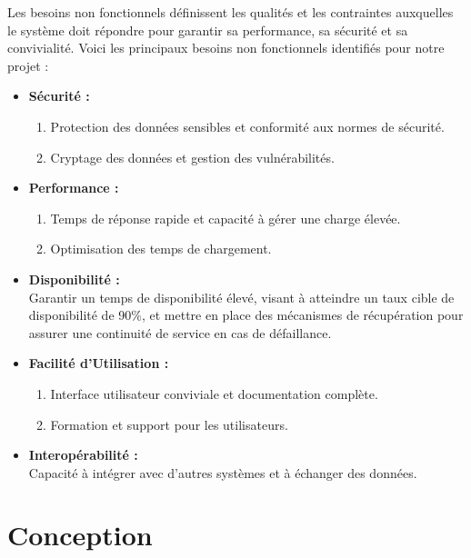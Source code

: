 \hspace{\parindent}Les besoins non fonctionnels définissent les qualités et les contraintes auxquelles le système doit répondre pour garantir sa performance, sa sécurité et sa convivialité. Voici les principaux besoins non fonctionnels identifiés pour notre projet :
\begin{itemize}
  \item \textbf{Sécurité :}
        \begin{enumerate}
          \item Protection des données sensibles et conformité aux normes de sécurité.
          \item Cryptage des données et gestion des vulnérabilités.
        \end{enumerate}

  \item \textbf{Performance :}
        \begin{enumerate}
          \item Temps de réponse rapide et capacité à gérer une charge élevée.
          \item Optimisation des temps de chargement.
        \end{enumerate}

  \item \textbf{Disponibilité :}\\
        Garantir un temps de disponibilité élevé, visant à atteindre un taux cible de disponibilité de 90\%, et mettre en place des mécanismes de récupération pour assurer une continuité de service en cas de défaillance.

  \item \textbf{Facilité d'Utilisation :}
        \begin{enumerate}
          \item Interface utilisateur conviviale et documentation complète.

          \item Formation et support pour les utilisateurs.
        \end{enumerate}

  \item \textbf{Interopérabilité :}\\
        Capacité à intégrer avec d'autres systèmes et à échanger des données.
\end{itemize}






\section{Conception}

